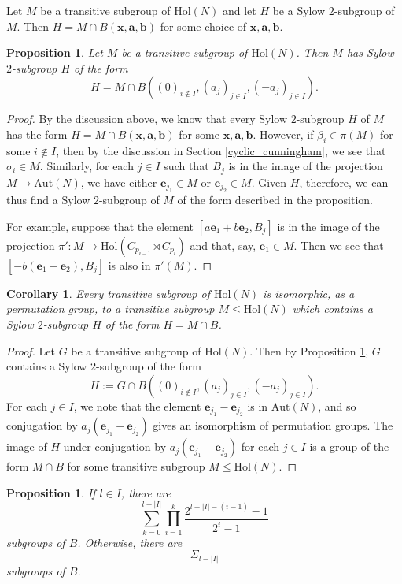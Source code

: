 \documentclass[a4paper,reqno]{amsart}
\newtheorem{proposition}[theorem]{Proposition}
\newtheorem{corollary}[theorem]{Corollary}
\theoremstyle{definition}
\newcommand{\e}{\textbf{e}}
\newcommand{\Aut}{\mathrm{Aut}}
\newcommand{\Hol}{\mathrm{Hol}}
\begin{document}
Let $M$ be a transitive subgroup of $\Hol(N)$ and let $H$ be a Sylow $2$-subgroup of $M$. Then $H=M \cap B(\mathbf{x},\mathbf{a},\mathbf{b})$ for some choice of $\mathbf{x},\mathbf{a},\mathbf{b}$.
\begin{proposition}\label{2-groups}
    Let $M$ be a transitive subgroup of $\Hol(N)$. Then $M$ has Sylow $2$-subgroup $H$ of the form
    \[H=M \cap B((0)_{i \notin I},(a_j)_{j \in I},(-a_j)_{j \in I}).\]
\end{proposition}
\begin{proof}
    By the discussion above, we know that every Sylow $2$-subgroup $H$ of $M$ has the form $H=M \cap B(\mathbf{x},\mathbf{a},\mathbf{b})$ for some $\mathbf{x},\mathbf{a},\mathbf{b}$. However, if $\beta_i \in \pi(M)$ for some $i \notin I$, then by the discussion in Section \ref{cyclic_cunningham}, we see that $\sigma_i \in M$. Similarly, for each $j \in I$ such that $B_j$ is in the image of the projection $M \to \Aut(N)$, we have either $\e_{j_1} \in M$ or $\e_{j_2} \in M$. Given $H$, therefore, we can thus find a Sylow $2$-subgroup of $M$ of the form described in the proposition.

    For example, suppose that the element $[a\e_1+b\e_2,B_j]$ is in the image of the projection $\pi':M \to \Hol(C_{p_{i-1}} \rtimes C_{p_i})$ and that, say, $\e_1 \in M$. Then we see that $[-b(\e_1-\e_2),B_j]$ is also in $\pi'(M)$.
\end{proof}
\begin{corollary}\label{2-isoms}
    Every transitive subgroup of $\Hol(N)$ is isomorphic, as a permutation group, to a transitive subgroup $M \leq \Hol(N)$ which contains a Sylow $2$-subgroup $H$ of the form $H=M \cap B$.
\end{corollary}
\begin{proof}
    Let $G$ be a transitive subgroup of $\Hol(N)$. Then by Proposition \ref{2-groups}, $G$ contains a Sylow $2$-subgroup of the form
    \[H:=G \cap B((0)_{i \notin I},(a_j)_{j \in I},(-a_j)_{j \in I}).\]
    For each $j \in I$, we note that the element $\e_{j_1}-\e_{j_2}$ is in $\Aut(N)$, and so conjugation by $a_j(\e_{j_1}-\e_{j_2})$ gives an isomorphism of permutation groups. The image of $H$ under conjugation by $a_j(\e_{j_1}-\e_{j_2})$ for each $j \in I$ is a group of the form $M \cap B$ for some transitive subgroup $M \leq \Hol(N)$.
\end{proof}
\begin{proposition}\label{cunningham_2gp_count}
    If $l \in I$, there are
    \[\sum_{k=0}^{l-|I|}\prod_{i=1}^k\frac{2^{l-|I|-(i-1)}-1}{2^i-1}\]
    subgroups of $B$.
    Otherwise, there are 
    \[\Sigma_{l-|I|}\]
    subgroups of $B$.
\end{proposition}
\end{document}
